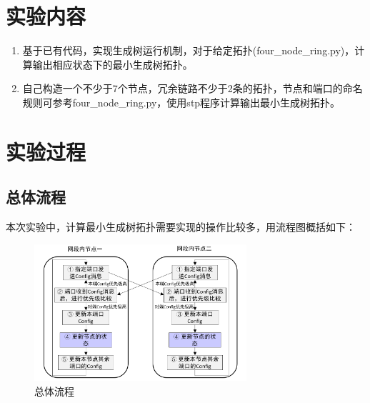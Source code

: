 \documentclass[UTF8]{report}
\begin{document}
\pagestyle{fancy}

\maketitle

\section{实验内容}

\begin{enumerate}
  \item 基于已有代码，实现生成树运行机制，对于给定拓扑(four_node_ring.py)，计算输出相应状态下的最小生成树拓扑。
  \item 自己构造一个不少于7个节点，冗余链路不少于2条的拓扑，节点和端口的命名规则可参考four_node_ring.py，使用stp程序计算输出最小生成树拓扑。
\end{enumerate}

\section{实验过程}

\subsection{总体流程}

本次实验中，计算最小生成树拓扑需要实现的操作比较多，用流程图概括如下：

\begin{figure}[H]
  \centering
  \includegraphics[width=0.7\textwidth]{total.png}
  \caption{总体流程}
\end{figure}
\end{document}
